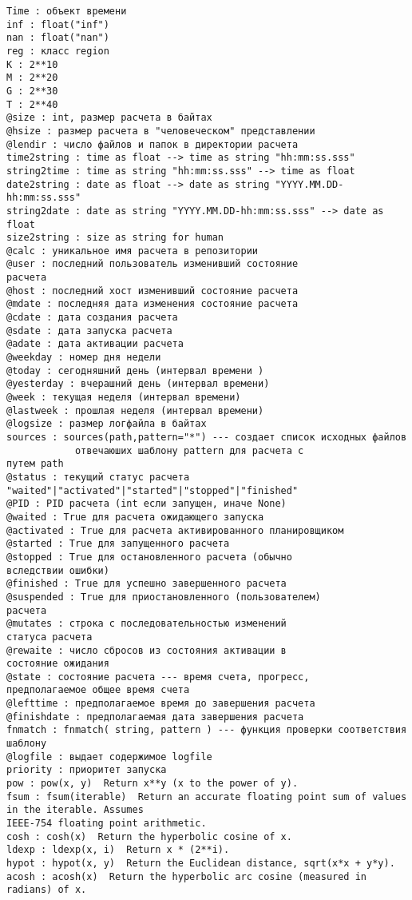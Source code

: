 \begin{verbatim}
Time : объект времени
inf : float("inf")
nan : float("nan")
reg : класс region
K : 2**10
M : 2**20
G : 2**30
T : 2**40
@size : int, размер расчета в байтах
@hsize : размер расчета в "человеческом" представлении
@lendir : число файлов и папок в директории расчета
time2string : time as float --> time as string "hh:mm:ss.sss"
string2time : time as string "hh:mm:ss.sss" --> time as float
date2string : date as float --> date as string "YYYY.MM.DD-hh:mm:ss.sss"
string2date : date as string "YYYY.MM.DD-hh:mm:ss.sss" --> date as float
size2string : size as string for human
@calc : уникальное имя расчета в репозитории
@user : последний пользователь изменивший состояние 
расчета
@host : последний хост изменивший состояние расчета
@mdate : последняя дата изменения состояние расчета
@cdate : дата создания расчета
@sdate : дата запуска расчета
@adate : дата активации расчета
@weekday : номер дня недели
@today : сегодняшний день (интервал времени )
@yesterday : вчерашний день (интервал времени)
@week : текущая неделя (интервал времени)
@lastweek : прошлая неделя (интервал времени)
@logsize : размер логфайла в байтах
sources : sources(path,pattern="*") --- создает список исходных файлов
			отвечаюших шаблону pattern для расчета c 
путем path
@status : текущий статус расчета 
"waited"|"activated"|"started"|"stopped"|"finished"
@PID : PID расчета (int если запущен, иначе None)
@waited : True для расчета ожидающего запуска
@activated : True для расчета активированного планировщиком
@started : True для запущенного расчета
@stopped : True для остановленного расчета (обычно 
вследствии ошибки)
@finished : True для успешно завершенного расчета
@suspended : True для приостановленного (пользователем) 
расчета
@mutates : строка с последовательностью изменений 
статуса расчета
@rewaite : число сбросов из состояния активации в 
состояние ожидания
@state : состояние расчета --- время счета, прогресс, 
предполагаемое общее время счета
@lefttime : предполагаемое время до завершения расчета
@finishdate : предполагаемая дата завершения расчета
fnmatch : fnmatch( string, pattern ) --- функция проверки соответствия 
шаблону
@logfile : выдает содержимое logfile
priority : приоритет запуска
pow : pow(x, y)  Return x**y (x to the power of y).
fsum : fsum(iterable)  Return an accurate floating point sum of values in the iterable. Assumes 
IEEE-754 floating point arithmetic.
cosh : cosh(x)  Return the hyperbolic cosine of x.
ldexp : ldexp(x, i)  Return x * (2**i).
hypot : hypot(x, y)  Return the Euclidean distance, sqrt(x*x + y*y).
acosh : acosh(x)  Return the hyperbolic arc cosine (measured in radians) of x.

\end{verbatim}

